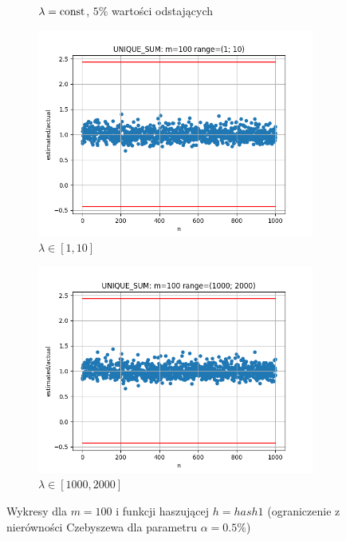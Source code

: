 \documentclass{article}
\begin{document}
\begin{figure}[H]
\begin{subfigure}{0.6\textwidth}
            \caption{$\lambda = \textnormal{const}$, $5\%$ wartości odstających}
        \end{subfigure}
        \begin{subfigure}{0.6\textwidth}
            \centering
            \includegraphics[width=\linewidth]{sum/zad1_range_1_10_cheb_05.png}
            \caption{$\lambda \in [1, 10]$}
        \end{subfigure}
        \begin{subfigure}{0.6\textwidth}
            \centering
            \includegraphics[width=\linewidth]{sum/zad1_range_1000_2000_cheb_05.png}
            \caption{$\lambda \in [1000, 2000]$}
        \end{subfigure}
        \caption{Wykresy dla $m = 100$ i funkcji haszującej $h = hash1$ (ograniczenie z nierówności Czebyszewa dla parametru $\alpha = 0.5\%$)}
    \end{figure}
\end{document}
